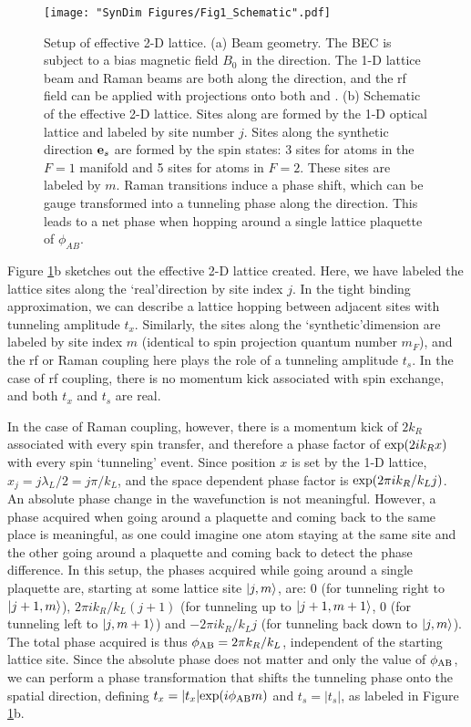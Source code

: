 \begin{figure}
	\texttt{[image: "SynDim Figures/Fig1\_Schematic".pdf]}
\caption[Setup of effective 2-D lattice]{Setup of effective 2-D lattice. (a) Beam geometry. The BEC is subject to a bias magnetic field $B_0$ in the \ez{} direction. The 1-D lattice beam and Raman beams are both along the \ex{} direction, and the rf field can be applied with projections onto both \ex{} and \ey{}. (b) Schematic of the effective 2-D lattice. Sites along \ex{} are formed by the 1-D optical lattice and labeled by site number $j$. Sites along the synthetic direction  $\textbf{e}_s{}$ are formed by the spin states: 3 sites for atoms in the $F=1$ manifold and 5 sites for atoms in $F=2$. These sites are labeled by $m$. Raman transitions induce a phase shift, which can be gauge transformed into a tunneling phase along the  \ex{} direction. This leads to a net phase when hopping around a single lattice plaquette of $\phi_{AB}$.  }
\label{fig:synDimSchematic}
\end{figure}


Figure \ref{fig:synDimSchematic}b sketches out the effective 2-D lattice created. Here, we have labeled the lattice sites along the \lq{real}\rq direction  \ex{} by site index $j$. In the tight binding approximation, we can describe a lattice hopping between adjacent sites with tunneling amplitude $t_x$. Similarly, the sites along the \lq{synthetic}\rq dimension are labeled by site index $m$ (identical to spin projection quantum number $m_F$), and the rf or Raman coupling here plays the role of a tunneling amplitude $t_s$. In the case of rf coupling, there is no momentum kick associated with spin exchange, and both $t_x$ and $t_s$ are real. 

In the case of Raman coupling, however, there is a momentum kick of $2k_R$ associated with every spin transfer, and therefore a phase factor of ${\rm exp}(2i k_R x)$ with every spin \lq{tunneling}\rq{} event. Since position $x$ is set by the 1-D lattice, $x_j = j \lambda_L/2 = j \pi/k_L$, and the space dependent phase factor is ${\rm exp}(2\pi i k_R/k_L j)$. An absolute phase change in the wavefunction is not meaningful. However, a phase acquired when going around a plaquette and coming back to the same place is meaningful, as one could imagine one atom staying at the same site and the other going around a plaquette and coming back to detect the phase difference. In this setup, the phases acquired while going around a single plaquette are, starting at some lattice site $\mathinner{|{j,m}\rangle}$, are: $0$ (for tunneling right to $\mathinner{|{j+1,m}\rangle}$), $2\pi i k_R/k_L (j+1)$ (for tunneling up to $\mathinner{|{j+1,m+1}\rangle}$, $0$ (for tunneling left to $\mathinner{|{j,m+1}\rangle}$) and $-2\pi i k_R/k_L j$ (for tunneling back down to $\mathinner{|{j,m}\rangle}$). The total phase acquired is thus $\phi_{\rm AB} = 2\pi k_R/k_L$, independent of the starting lattice site. Since the absolute phase does not matter and only the value of $\phi_{\rm AB}$, we can perform a phase transformation that shifts the tunneling phase onto the spatial direction, defining $t_x = |t_x|{\rm exp}(i\phi_{\rm AB}m)$ and $t_s=|t_s|$, as labeled in Figure \ref{fig:synDimSchematic}b. 

